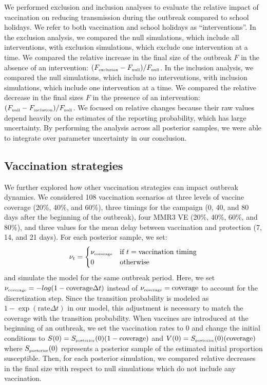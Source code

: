 \documentclass[12pt]{article}
\newcommand{\tsub}[2]{#1_{{\textrm{\tiny #2}}}}
\begin{document}
We performed exclusion and inclusion analyses to evaluate the relative impact of vaccination on reducing transmission during the outbreak compared to school holidays.
We refer to both vaccination and school holidays as ``interventions''.
In the exclusion analysis, we compared the null simulations, which include all interventions, with exclusion simulations, which exclude one intervention at a time.
We compared the relative increase in the final size of the outbreak $F$ in the absence of an intervention: $(\tsub{F}{exclusion}-\tsub{F}{null})/\tsub{F}{null}$.
In the inclusion analysis, we compared the null simulations, which include no interventions, with inclusion simulations, which include one intervention at a time.
We compared the relative decrease in the final sizes $F$ in the presence of an intervention: $(\tsub{F}{null}-\tsub{F}{inclusion})/\tsub{F}{null}$.
We focused on relative changes because their raw values depend heavily on the estimates of the reporting probability, which has large uncertainty.
By performing the analysis across all posterior samples, we were able to integrate over parameter uncertainty in our conclusion.

\subsection{Vaccination strategies}

We further explored how other vaccination strategies can impact outbreak dynamics.
We considered 108 vaccination scenarios at three levels of vaccine coverage (20\%, 40\%, and 60\%), three timings for the campaign (0, 40, and 80 days after the beginning of the outbreak), four MMR3 VE (20\%, 40\%, 60\%, and 80\%), and three values for the mean delay between vaccination and protection (7, 14, and 21 days).
For each posterior sample, we set:
\begin{equation}
\nu_t = \begin{cases}
\tsub{\nu}{coverage} & \textrm{if } t = \textrm{vaccination timing}\\
0 & \textrm{otherwise}
\end{cases}
\end{equation}
and simulate the model for the same outbreak period.
Here, we set $\tsub{\nu}{coverage} = -log(1-\textrm{coverage} \Delta t)$ instead of $\tsub{\nu}{coverage} = \textrm{coverage}$ to account for the discretization step.
Since the transition probability is modeled as $1-\exp(\mathrm{rate} \Delta t)$ in our model, this adjustment is necessary to match the coverage with the transition probability.
When vaccines are introduced at the beginning of an outbreak, we set the vaccination rates to 0 and change the initial conditions to $S(0) = \tsub{S}{posterior}(0) (1 - \textrm{coverage})$ and $V(0) = \tsub{S}{posterior}(0) (\textrm{coverage})$ where $\tsub{S}{posterior}(0)$ represents a posterior sample of the estimated initial proportion susceptible.
Then, for each posterior simulation, we compared relative decreases in the final size with respect to null simulations which do not include any vaccination.
\end{document}
